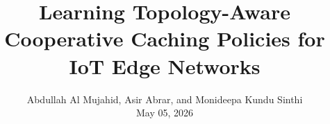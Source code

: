\documentclass[11pt,journal,onecolumn,draftclsnofoot]{IEEEtran}
\title{Learning Topology-Aware Cooperative Caching Policies for IoT Edge Networks}
\author{Abdullah Al Mujahid, Asir Abrar, and Monideepa Kundu Sinthi\\
May 05, 2026
}
\begin{document}
\maketitle

\begin{abstract}

\end{abstract}

















\end{document}
